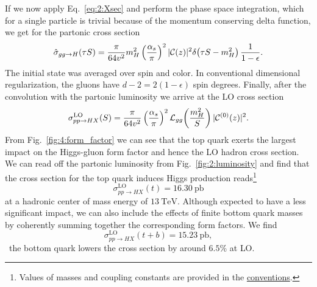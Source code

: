 If we now apply Eq.~\eqref{eq:2:Xsec} and perform the phase space integration, which for a single particle is trivial because of the momentum conserving delta function, we get for the partonic cross section
\begin{equation}
\hat{\sigma}_{gg \rightarrow H}(\tau S) = \frac{\pi}{64 v^2} m_H^2 \left( \frac{\alpha_s}{\pi} \right)^2 |\mathcal{C}(z)|^2 \delta\! \left(\tau S - m_H^2 \right) \frac{1}{1 - \epsilon}.
\label{eq:4:ggH_cross_section}
\end{equation}
The initial state was averaged over spin and color. In conventional dimensional regularization, the gluons have $d - 2 = 2 (1 - \epsilon)$ spin degrees. Finally, after the convolution with the partonic luminosity we arrive at the LO cross section
\begin{equation}
\sigma_{pp \rightarrow HX}^{\text{LO}}(S) = \frac{\pi}{64v^2} \left(\frac{\alpha_s}{\pi} \right)^2 \mathcal{L}_{gg}\!\left(\frac{m_H^2}{S} \right) |\mathcal{C}^{(0)}(z)|^2.
\end{equation}
From Fig.~\ref{fig:4:form_factor} we can see that the top quark exerts the largest impact on the Higgs-gluon form factor and hence the \acs{LO} hadron cross section. We can read off the partonic luminosity from Fig.~\ref{fig:2:luminosity} and find that the cross section for the top quark induces Higgs production reads\footnote{Values of masses and coupling constants are provided in the \hyperref[chap:notation_and_conventions]{conventions}.}
\begin{equation}
\sigma_{pp \rightarrow HX}^{\text{LO}} (t) = 16.30\ \mathrm{pb}
\end{equation}
at a hadronic center of mass energy of $13\ \text{TeV}$. Although expected to have a less significant impact, we can also include the effects of finite bottom quark masses by coherently summing together the corresponding form factors. We find
\begin{equation}
\sigma_{pp \rightarrow HX}^{\text{LO}}(t+b) = 15.23\ \mathrm{pb},
\end{equation}
\ie\ the bottom quark lowers the cross section by around $6.5\%$ at \acs{LO}.

